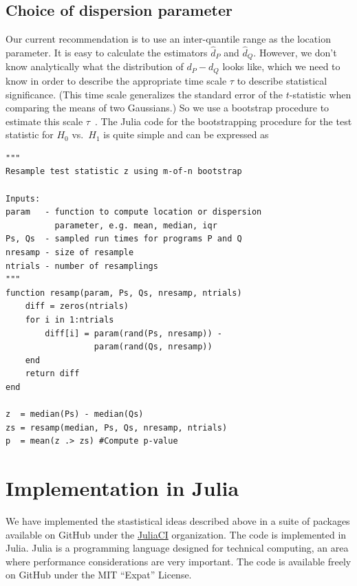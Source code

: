\documentclass[conference]{IEEEtran}
\begin{document}
\subsection{Choice of dispersion parameter}

Our current recommendation is to use an inter-quantile range as the location parameter. It is easy to calculate the estimators $\hat d_P$ and $\hat d_Q$. However, we don't know analytically what the distribution of $d_P - d_Q$ looks like, which we need to know in order to describe the appropriate time scale $\tau$ to describe statistical significance. (This time scale generalizes the standard error of the $t$-statistic when comparing the means of two Gaussians.) So we use a bootstrap procedure to estimate this scale $\tau$~\cite{Chernick2008}. The Julia code for the bootstrapping procedure for the test statistic for $H_0$ vs.\ $H_1$ is quite simple and can be expressed as

\begin{lstlisting}
"""
Resample test statistic z using m-of-n bootstrap

Inputs:
param   - function to compute location or dispersion
          parameter, e.g. mean, median, iqr
Ps, Qs  - sampled run times for programs P and Q
nresamp - size of resample
ntrials - number of resamplings
"""
function resamp(param, Ps, Qs, nresamp, ntrials)
    diff = zeros(ntrials)
    for i in 1:ntrials
        diff[i] = param(rand(Ps, nresamp)) -
                  param(rand(Qs, nresamp))
    end
    return diff
end

z  = median(Ps) - median(Qs)
zs = resamp(median, Ps, Qs, nresamp, ntrials)
p  = mean(z .> zs) #Compute p-value
\end{lstlisting}




\section{Implementation in Julia}

We have implemented the stastistical ideas described above in a suite of packages available on GitHub under the \href{https://github.com/JuliaCI}{JuliaCI} organization.
The code is implemented in Julia. Julia is a programming language designed for technical computing, an area where performance considerations are very important.
The code is available freely on GitHub under the MIT ``Expat'' License.
\end{document}
